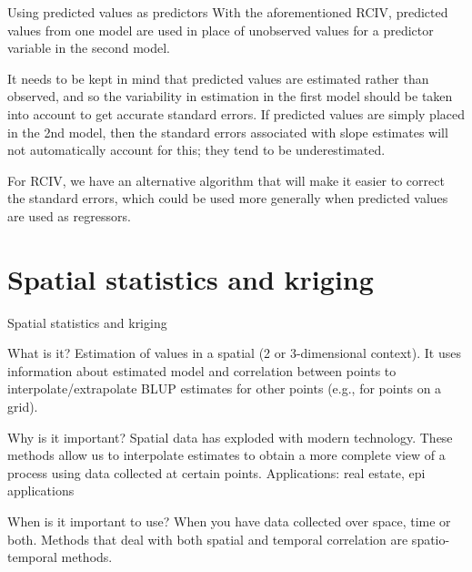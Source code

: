 \documentclass[
  9pt,
  ignorenonframetext,
]{beamer}
\begin{document}
\begin{frame}{Using predicted values as predictors}
\protect\hypertarget{using-predicted-values-as-predictors}{}
With the aforementioned RCIV, predicted values from one model are used
in place of unobserved values for a predictor variable in the second
model.

It needs to be kept in mind that predicted values are estimated rather
than observed, and so the variability in estimation in the first model
should be taken into account to get accurate standard errors. If
predicted values are simply placed in the 2nd model, then the standard
errors associated with slope estimates will not automatically account
for this; they tend to be underestimated.

For RCIV, we have an alternative algorithm that will make it easier to
correct the standard errors, which could be used more generally when
predicted values are used as regressors.
\end{frame}

\hypertarget{spatial-statistics-and-kriging}{%
\section{Spatial statistics and
kriging}\label{spatial-statistics-and-kriging}}

\begin{frame}{Spatial statistics and kriging}
\protect\hypertarget{spatial-statistics-and-kriging-1}{}
\begin{block}{What is it?}
\protect\hypertarget{what-is-it-2}{}
Estimation of values in a spatial (2 or 3-dimensional context). It uses
information about estimated model and correlation between points to
interpolate/extrapolate BLUP estimates for other points (e.g., for
points on a grid).
\end{block}

\begin{block}{Why is it important?}
\protect\hypertarget{why-is-it-important-2}{}
Spatial data has exploded with modern technology. These methods allow us
to interpolate estimates to obtain a more complete view of a process
using data collected at certain points. Applications: real estate, epi
applications
\end{block}

\begin{block}{When is it important to use?}
\protect\hypertarget{when-is-it-important-to-use-2}{}
When you have data collected over space, time or both. Methods that deal
with both spatial and temporal correlation are spatio-temporal methods.
\end{block}
\end{frame}
\end{document}
